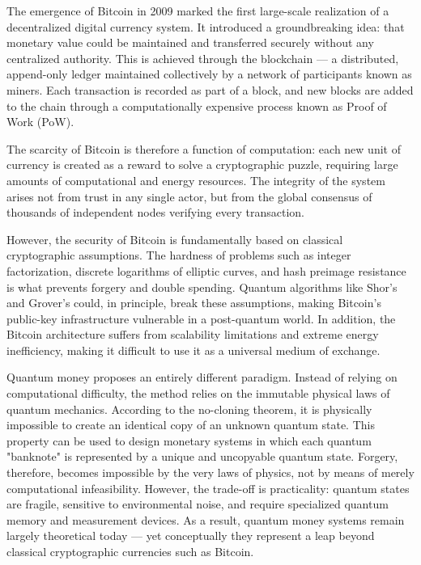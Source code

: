 \documentclass[a4paper,10.5pt,twoside]{article}
\begin{document}
The emergence of Bitcoin in 2009 marked the first large-scale realization of a decentralized digital currency system. It introduced a groundbreaking idea: that monetary value could be maintained and transferred securely without any centralized authority. This is achieved through the blockchain — a distributed, append-only ledger maintained collectively by a network of participants known as miners. Each transaction is recorded as part of a block, and new blocks are added to the chain through a computationally expensive process known as Proof of Work (PoW).

The scarcity of Bitcoin is therefore a function of computation: each new unit of currency is created as a reward to solve a cryptographic puzzle, requiring large amounts of computational and energy resources. The integrity of the system arises not from trust in any single actor, but from the global consensus of thousands of independent nodes verifying every transaction.

However, the security of Bitcoin is fundamentally based on classical cryptographic assumptions. The hardness of problems such as integer factorization, discrete logarithms of elliptic curves, and hash preimage resistance is what prevents forgery and double spending. Quantum algorithms like Shor's and Grover's could, in principle, break these assumptions, making Bitcoin's public-key infrastructure vulnerable in a post-quantum world. In addition, the Bitcoin architecture suffers from scalability limitations and extreme energy inefficiency, making it difficult to use it as a universal medium of exchange.

Quantum money proposes an entirely different paradigm. Instead of relying on computational difficulty, the method relies on the immutable physical laws of quantum mechanics. According to the no-cloning theorem, it is physically impossible to create an identical copy of an unknown quantum state. This property can be used to design monetary systems in which each quantum "banknote" is represented by a unique and uncopyable quantum state. Forgery, therefore, becomes impossible by the very laws of physics, not by means of merely computational infeasibility. However, the trade-off is practicality: quantum states are fragile, sensitive to environmental noise, and require specialized quantum memory and measurement devices. As a result, quantum money systems remain largely theoretical today — yet conceptually they represent a leap beyond classical cryptographic currencies such as Bitcoin.
\end{document}
